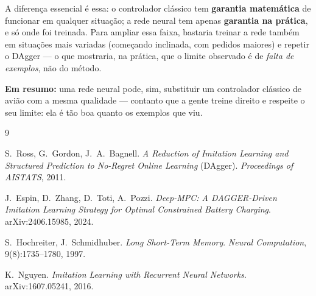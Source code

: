 \documentclass[11pt,a4paper]{article}
\begin{document}
A diferença essencial é essa: o controlador clássico tem \textbf{garantia matemática}
de funcionar em qualquer situação; a rede neural tem apenas \textbf{garantia na
prática}, e só onde foi treinada. Para ampliar essa faixa, bastaria treinar a rede
também em situações mais variadas (começando inclinada, com pedidos maiores) e repetir
o DAgger --- o que mostraria, na prática, que o limite observado é de \emph{falta de
exemplos}, não do método.

\textbf{Em resumo:} uma rede neural pode, sim, substituir um controlador clássico de
avião com a mesma qualidade --- contanto que a gente treine direito e respeite o seu
limite: ela é tão boa quanto os exemplos que viu.

\begin{thebibliography}{9}\small

 S.~Ross, G.~Gordon, J.~A.~Bagnell.
\emph{A Reduction of Imitation Learning and Structured Prediction to No-Regret Online
Learning} (DAgger). \emph{Proceedings of AISTATS}, 2011.

 J.~Espin, D.~Zhang, D.~Toti, A.~Pozzi.
\emph{Deep-MPC: A DAGGER-Driven Imitation Learning Strategy for Optimal Constrained
Battery Charging}. arXiv:2406.15985, 2024.

 S.~Hochreiter, J.~Schmidhuber.
\emph{Long Short-Term Memory}. \emph{Neural Computation}, 9(8):1735--1780, 1997.

 K.~Nguyen.
\emph{Imitation Learning with Recurrent Neural Networks}. arXiv:1607.05241, 2016.

\end{thebibliography}
\end{document}
